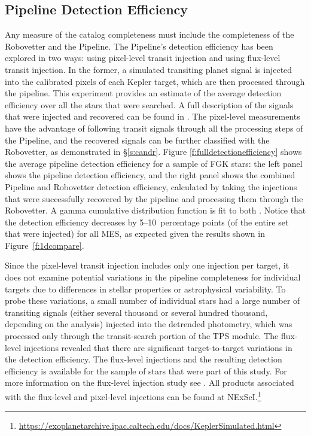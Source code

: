 \subsection{Pipeline Detection Efficiency}

Any measure of the catalog completeness must include the completeness of the Robovetter and the \Kepler{} Pipeline. The Pipeline's detection efficiency has been explored in two ways: using pixel-level transit injection and using flux-level transit injection. In the former, a simulated transiting planet signal is injected into the calibrated pixels of each Kepler target, which are then processed through the pipeline. This experiment provides an estimate of the average detection efficiency over all the stars that were searched. A full description of the signals that were injected and recovered can be found in \citet{Christiansen2017}. The pixel-level measurements have the advantage of following transit signals through all the processing steps of the \Kepler{} Pipeline, and the recovered signals can be further classified with the Robovetter, as demonstrated in \S\ref{s:candr}. Figure \ref{f:fulldetectionefficiency} shows the average pipeline detection efficiency for a sample of FGK stars: the left panel shows the pipeline detection efficiency, and the right panel shows the combined Pipeline and Robovetter detection efficiency, calculated by taking the injections that were successfully recovered by the pipeline and processing them through the Robovetter. 
{\color{blue}A gamma cumulative distribution function is fit to both \citep[see equation 1 of ][]{Christiansen2016}.  Notice that the detection efficiency decreases by 5--10~percentage points (of the entire set that were injected) for all MES, as expected given the results shown in Figure~\ref{f:1dcompare}. }



Since the pixel-level transit injection includes only one injection per target, it does not examine potential variations in the pipeline completeness for individual targets due to differences in stellar properties or astrophysical variability. To probe these variations, a small number of individual stars had a large number of transiting signals (either several thousand or several hundred thousand, depending on the analysis) injected into the detrended photometry, which was processed only through the transit-search portion of the TPS module. The flux-level injections revealed that there are significant target-to-target variations in the detection efficiency. The flux-level injections and the resulting detection efficiency is available for the sample of stars that were part of this study. For more information on the flux-level injection study see \citet{Burke2017c}. All products associated with the flux-level and pixel-level injections can be found at NExScI.\footnote{\url{https://exoplanetarchive.ipac.caltech.edu/docs/KeplerSimulated.html}}


